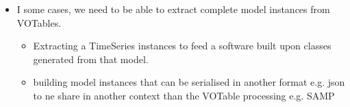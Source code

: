 \begin{itemize}
  \item I some cases, we need to be able to extract complete model instances from VOTables.
    \begin{itemize}
      \item Extracting a TimeSeries instances to feed a software built upon classes generated from that model.
      \item building model instances that can be serialised in another format e.g. json to ne share in another context than the VOTable processing e.g. SAMP
   \end{itemize}          
    
\end{itemize} 

